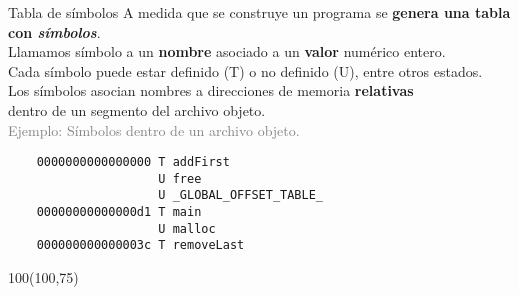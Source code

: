 \documentclass[aspectratio=169]{beamer}
\begin{document}
\begin{frame}[fragile,t]{Tabla de símbolos}
    A medida que se construye un programa se \textbf{genera una tabla con \emph{símbolos}}.\\
    \bigskip
    Llamamos símbolo a un \textbf{nombre} asociado a un \textbf{valor} numérico entero.\\
    Cada símbolo puede estar definido (T) o no definido (U), entre otros estados.\\
    \bigskip
    Los símbolos asocian nombres a direcciones de memoria \textbf{relativas}\\ dentro de un segmento del archivo objeto.\\
    \pause
    \bigskip
    \textcolor{gray}{Ejemplo: Símbolos dentro de un archivo objeto.}
    { \small
    \begin{verbatim}
    0000000000000000 T addFirst
                     U free
                     U _GLOBAL_OFFSET_TABLE_
    00000000000000d1 T main
                     U malloc
    000000000000003c T removeLast
    \end{verbatim}
    }
    \begin{textblock}{100}(100,75)
    \end{textblock}
\end{frame}
\end{document}
